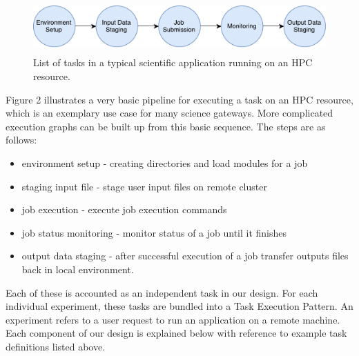 \documentclass[review]{elsarticle}
\begin{document}
\begin{figure}
\includegraphics[height=0.8in, width=4.8 in]{figures/figure2.pdf}
\caption{List of tasks in a typical scientific application running on an HPC resource.}
\end{figure}

Figure 2 illustrates a very basic pipeline for executing a task on an HPC resource, which is an exemplary use case for many science gateways.  More complicated execution graphs can be built up from this basic sequence. The steps are as follows:
\begin{itemize}
\item environment setup - creating directories and load modules for a job
\item staging input file - stage user input files on remote cluster
\item job execution - execute job execution commands
\item job status monitoring - monitor status of a job until it finishes
\item output data staging - after successful execution of a job transfer outputs files back in local environment.
\end{itemize}
Each of these is accounted as an independent task in our design. For each individual experiment, these tasks are bundled into a Task Execution Pattern. An experiment refers to a user request to run an application on a remote machine. Each component of our design is explained below with reference to example task definitions listed above.
\end{document}
